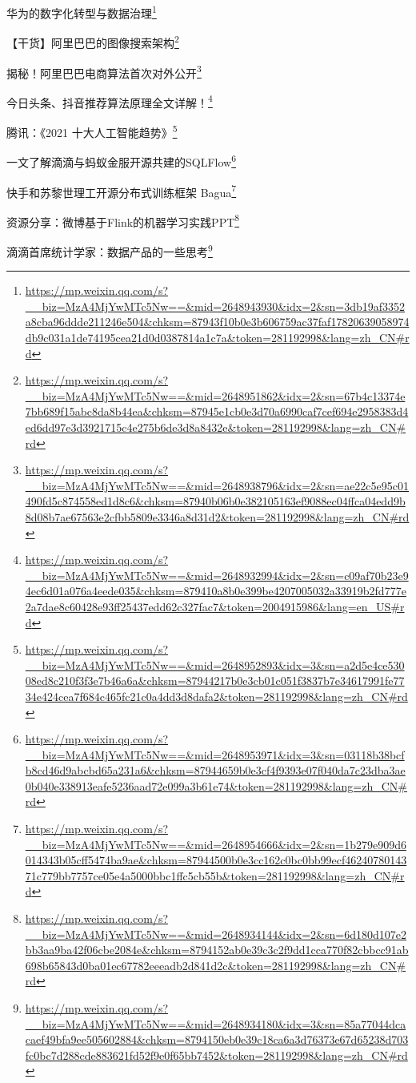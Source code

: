 \documentclass[]{ctexbook}
\renewcommand{\href}[2]{#2\footnote{\url{#1}}}
\begin{document}
\href{https://mp.weixin.qq.com/s?__biz=MzA4MjYwMTc5Nw==\&mid=2648943930\&idx=2\&sn=3db19af3352a8cba96ddde211246e504\&chksm=87943f10b0e3b606759ac37faf17820639058974db9c031a1de74195cea21d0d0387814a1c7a\&token=281192998\&lang=zh_CN\#rd}{华为的数字化转型与数据治理}

\href{https://mp.weixin.qq.com/s?__biz=MzA4MjYwMTc5Nw==\&mid=2648951862\&idx=2\&sn=67b4c13374e7bb689f15abc8da8b44ea\&chksm=87945e1cb0e3d70a6990caf7cef694e2958383d4ed6dd97e3d3921715c4e275b6de3d8a8432e\&token=281192998\&lang=zh_CN\#rd}{【干货】阿里巴巴的图像搜索架构}

\href{https://mp.weixin.qq.com/s?__biz=MzA4MjYwMTc5Nw==\&mid=2648938796\&idx=2\&sn=ae22c5e95c01490fd5c874558ed1d8c6\&chksm=87940b06b0e382105163ef9088ec04ffca04edd9b8d08b7ae67563e2cfbb5809e3346a8d31d2\&token=281192998\&lang=zh_CN\#rd}{揭秘！阿里巴巴电商算法首次对外公开}

\href{https://mp.weixin.qq.com/s?__biz=MzA4MjYwMTc5Nw==\&mid=2648932994\&idx=2\&sn=c09af70b23e94ec6d01a076a4eede035\&chksm=879410a8b0e399be4207005032a33919b2fd777e2a7dae8c60428e93ff25437edd62c327fac7\&token=2004915986\&lang=en_US\#rd}{今日头条、抖音推荐算法原理全文详解！}

\href{https://mp.weixin.qq.com/s?__biz=MzA4MjYwMTc5Nw==\&mid=2648952893\&idx=3\&sn=a2d5e4ce53008ed8c210f3f3e7b46a6a\&chksm=87944217b0e3cb01c051f3837b7e34617991fe7734e424cea7f684c465fc21c0a4dd3d8dafa2\&token=281192998\&lang=zh_CN\#rd}{腾讯：《2021 十大人工智能趋势》}

\href{https://mp.weixin.qq.com/s?__biz=MzA4MjYwMTc5Nw==\&mid=2648953971\&idx=3\&sn=03118b38bcfb8cd46d9abcbd65a231a6\&chksm=87944659b0e3cf4f9393e07f040da7c23dba3ae0b040e338913eafe5236aad72e099a3b61e74\&token=281192998\&lang=zh_CN\#rd}{一文了解滴滴与蚂蚁金服开源共建的SQLFlow}

\href{https://mp.weixin.qq.com/s?__biz=MzA4MjYwMTc5Nw==\&mid=2648954666\&idx=2\&sn=1b279e909d6014343b05cff5474ba9ae\&chksm=87944500b0e3cc162c0bc0bb99ecf4624078014371c779bb7757ce05e4a5000bbc1ffc5cb55b\&token=281192998\&lang=zh_CN\#rd}{快手和苏黎世理工开源分布式训练框架 Bagua}

\href{https://mp.weixin.qq.com/s?__biz=MzA4MjYwMTc5Nw==\&mid=2648934144\&idx=2\&sn=6d180d107e2bb3aa9ba42f06cbe2084e\&chksm=8794152ab0e39c3c2f9dd1cca770f82cbbcc91ab698b65843d0ba01ec67782eeeadb2d841d2c\&token=281192998\&lang=zh_CN\#rd}{资源分享：微博基于Flink的机器学习实践PPT}

\href{https://mp.weixin.qq.com/s?__biz=MzA4MjYwMTc5Nw==\&mid=2648934180\&idx=3\&sn=85a77044dcacaef49bfa9ee505602884\&chksm=8794150eb0e39c18ca6a3d76373e67d65238d703fc0bc7d288cde883621fd52f9e0f65bb7452\&token=281192998\&lang=zh_CN\#rd}{滴滴首席统计学家：数据产品的一些思考}
\end{document}
